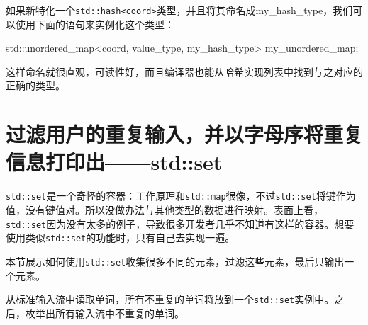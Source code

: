 如果新特化一个\texttt{std::hash<coord>}类型，并且将其命名成my\_hash\_type，我们可以使用下面的语句来实例化这个类型：

\begin{codebox}[cpp]
std::unordered_map<coord, value_type, my_hash_type> my_unordered_map;
\end{codebox}

这样命名就很直观，可读性好，而且编译器也能从哈希实现列表中找到与之对应的正确的类型。


\section{过滤用户的重复输入，并以字母序将重复信息打印出——std::set}

\texttt{std::set}是一个奇怪的容器：工作原理和\texttt{std::map}很像，不过\texttt{std::set}将键作为值，没有键值对。所以没做办法与其他类型的数据进行映射。表面上看，\texttt{std::set}因为没有太多的例子，导致很多开发者几乎不知道有这样的容器。想要使用类似\texttt{std::set}的功能时，只有自己去实现一遍。

本节展示如何使用\texttt{std::set}收集很多不同的元素，过滤这些元素，最后只输出一个元素。


从标准输入流中读取单词，所有不重复的单词将放到一个\texttt{std::set}实例中。之后，枚举出所有输入流中不重复的单词。

